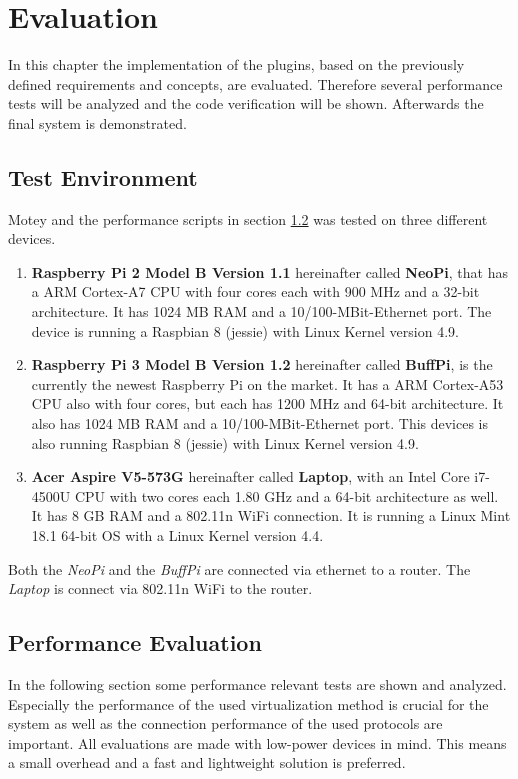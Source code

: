 \chapter{Evaluation}
\label{chapter:evaluation}
\minitoc\vspace{.5cm}
In this chapter the implementation of the plugins, based on the previously defined requirements and concepts, are evaluated.
Therefore several performance tests will be analyzed and the code verification will be shown.
Afterwards the final system is demonstrated.

\section{Test Environment}
\label{section:test-environment}
Motey and the performance scripts in section \ref{section:performance-evaluation} was tested on three different devices.
\begin{enumerate}
  \item \textbf{Raspberry Pi 2 Model B Version 1.1} hereinafter called \textbf{NeoPi}, that has a ARM Cortex-A7 \ac{CPU} with four cores each with 900 MHz and a 32-bit architecture. It has 1024 MB \ac{RAM} and a 10/100-MBit-Ethernet port. The device is running a Raspbian 8 (jessie) with Linux Kernel version 4.9.
  \item \textbf{Raspberry Pi 3 Model B Version 1.2} hereinafter called \textbf{BuffPi}, is the currently the newest Raspberry Pi on the market. It has a ARM Cortex-A53 \ac{CPU} also with four cores, but each has 1200 MHz and 64-bit architecture. It also has 1024 MB \ac{RAM} and a 10/100-MBit-Ethernet port.  This devices is also running Raspbian 8 (jessie) with Linux Kernel version 4.9.
  \item \textbf{Acer Aspire V5-573G} hereinafter called \textbf{Laptop}, with an Intel Core i7-4500U \ac{CPU} with two cores each 1.80 GHz and a 64-bit architecture as well. It has 8 GB \ac{RAM} and a 802.11n WiFi connection. It is running a Linux Mint 18.1  64-bit \ac{OS} with a Linux Kernel version 4.4.
\end{enumerate}

Both the \textit{NeoPi} and the \textit{BuffPi} are connected via ethernet to a router.
The \textit{Laptop} is connect via 802.11n WiFi to the router.

\section{Performance Evaluation}
\label{section:performance-evaluation}
In the following section some performance relevant tests are shown and analyzed.
Especially the performance of the used virtualization method is crucial for the system as well as the connection performance of the used protocols are important.
All evaluations are made with low-power devices in mind.
This means a small overhead and a fast and lightweight solution is preferred.

